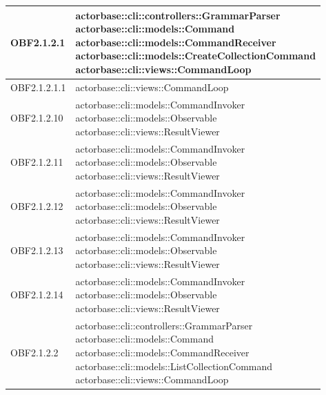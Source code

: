 \documentclass{scalatekids-article}
\begin{document}
\begin{longtable}[H]{|p{4.5cm}|p{13cm}|}
  \hline
  OBF2.1.2.1 & \multiLineCell[t]{actorbase::cli::controllers::GrammarParser\\actorbase::cli::models::Command\\actorbase::cli::models::CommandReceiver\\actorbase::cli::models::CreateCollectionCommand\\actorbase::cli::views::CommandLoop\\}\\
  \hline
  OBF2.1.2.1.1 & \multiLineCell[t]{actorbase::cli::views::CommandLoop\\}\\
  \hline
  OBF2.1.2.10 & \multiLineCell[t]{actorbase::cli::models::CommandInvoker\\actorbase::cli::models::Observable\\actorbase::cli::views::ResultViewer\\}\\
  \hline
  OBF2.1.2.11 & \multiLineCell[t]{actorbase::cli::models::CommandInvoker\\actorbase::cli::models::Observable\\actorbase::cli::views::ResultViewer\\}\\
  \hline
  OBF2.1.2.12 & \multiLineCell[t]{actorbase::cli::models::CommandInvoker\\actorbase::cli::models::Observable\\actorbase::cli::views::ResultViewer\\}\\
  \hline
  OBF2.1.2.13 & \multiLineCell[t]{actorbase::cli::models::CommandInvoker\\actorbase::cli::models::Observable\\actorbase::cli::views::ResultViewer\\}\\
  \hline
  OBF2.1.2.14 & \multiLineCell[t]{actorbase::cli::models::CommandInvoker\\actorbase::cli::models::Observable\\actorbase::cli::views::ResultViewer\\}\\
  \hline
  OBF2.1.2.2 & \multiLineCell[t]{actorbase::cli::controllers::GrammarParser\\actorbase::cli::models::Command\\actorbase::cli::models::CommandReceiver\\actorbase::cli::models::ListCollectionCommand\\actorbase::cli::views::CommandLoop\\}\\

\end{longtable}
\end{document}
